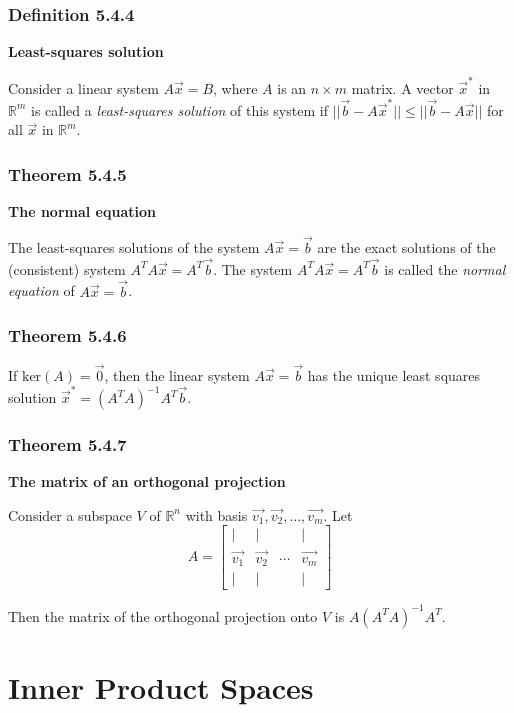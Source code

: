 \documentclass{report}
\begin{document}
\subsubsection*{Definition 5.4.4}
\par\noindent\textbf{Least-squares solution}
\par\noindent Consider a linear system $A\vec{x}=B$, where $A$ is an $n\times{}m$ matrix. A vector $\vec{x}^{*}$ in $\mathbb{R}^{m}$ is called a \textit{least-squares solution} of this system if $||\vec{b}-A\vec{x}^{*}||\le{}||\vec{b}-A\vec{x}||$ for all $\vec{x}$ in $\mathbb{R}^{m}$.
\subsubsection*{Theorem 5.4.5}
\par\noindent\textbf{The normal equation}
\par\noindent The least-squares solutions of the system $A\vec{x}=\vec{b}$ are the exact solutions of the (consistent) system $A^{T}A\vec{x}=A^{T}\vec{b}$. The system $A^{T}A\vec{x}=A^{T}\vec{b}$ is called the \textit{normal equation} of $A\vec{x}=\vec{b}$.
\subsubsection*{Theorem 5.4.6}
\par\noindent If $\textrm{ker}(A)={\vec{0}}$, then the linear system $A\vec{x}=\vec{b}$ has the unique least squares solution $\vec{x}^{*}=(A^{T}A)^{-1}A^{T}\vec{b}.$
\subsubsection*{Theorem 5.4.7}
\par\noindent\textbf{The matrix of an orthogonal projection}
\par\noindent Consider a subspace $V$ of $\mathbb{R}^{n}$ with basis $\vec{v_{1}},\vec{v_{2}},\ldots{},\vec{v_{m}}$. Let
\[A=\left[\begin{array}{cccc}|&|&&|\\{}\vec{v_{1}}&\vec{v_{2}}&\cdots{}&\vec{v_{m}}\\{}|&|&&|\end{array}\right]\]
\par\noindent Then the matrix of the orthogonal projection onto $V$ is $A(A^{T}A)^{-1}A^{T}$.

\section{Inner Product Spaces}
\end{document}
